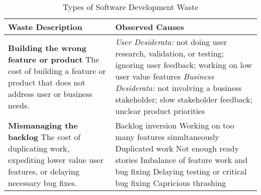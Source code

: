 \begin{table*}[htbp]
\renewcommand{\arraystretch}{1.3}
\centering
\caption{Types of Software Development Waste}
\label{Waste}
\begin{tabular}{|p{2.5in}|p{3.6in}|} %
\hline
\textbf{Waste} \newline Description & Observed Causes                                                                                                                                                                                                                                                                                                                                                                                                                     \\ \hline
\textbf{Building the wrong feature or product} \newline
The cost of building a feature or product that does not address user or business needs.                                  & \textit{User Desiderata:} not doing user research, validation, or testing; ignoring user feedback; working on low user value features \newline \textit{Business Desiderata:} not involving a business stakeholder; slow stakeholder feedback; unclear product priorities                                                                                                                                                                                  \\ \hline
\textbf{Mismanaging the backlog  } \newline 
The cost of duplicating work, expediting lower value user features, or delaying necessary bug fixes.
& Backlog inversion \newline Working on too many features simultaneously \newline Duplicated work \newline Not enough ready stories  \newline Imbalance of feature work and bug fixing \newline Delaying testing or critical bug fixing  \newline Capricious thrashing                                                                                                                                                                                                                                                                                                                                \\ \hline

\end{tabular}
\end{table*}
